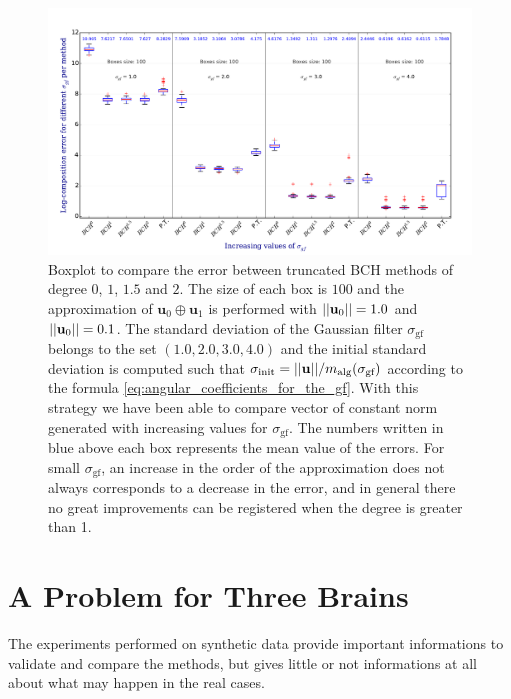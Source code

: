\begin{figure}[!ht]
	\hspace{-0.5cm}
	\includegraphics[scale=0.5]{figures/SVF_boxplot_comparisons_BCH.pdf}
	\caption{Boxplot to compare the error between truncated BCH methods of degree $0$, $1$, $1.5$ and $2$. The size of each box is $100$ and the approximation of $\mathbf{u}_{0}\oplus \mathbf{u}_1$ is performed with $\vert\lvert \mathbf{u}_{0} \rvert\vert = 1.0$ and $\vert\lvert \mathbf{u}_{0} \rvert\vert = 0.1$. The standard deviation of the Gaussian filter $\sigma_{\text{gf}}$ belongs to the set $(1.0, 2.0, 3.0, 4.0)$ and the initial standard deviation is computed such that $\sigma_{\text{init}} = \vert\lvert \mathbf{u} \rvert\vert/m_{\text{alg}}(\sigma_{\text{gf}})$ according to the formula \ref{eq:angular_coefficients_for_the_gf}. With this strategy we have been able to compare vector of constant norm generated with increasing values for $\sigma_{\text{gf}}$. The numbers written in blue above each box represents the mean value of the errors. For small $\sigma_{\text{gf}}$, an increase in the order of the approximation does not always corresponds to a decrease in the error, and in general there no great improvements can be registered when the degree is greater than 1. }
	\label{fig:SVF_boxplot_comparisons_BCH}
\end{figure}


\newpage

\section{A Problem for Three Brains}\label{se:three_brains} %
The experiments performed on synthetic data provide important informations to validate and compare the methods, but gives little or not informations at all about what may happen in the real cases. 

